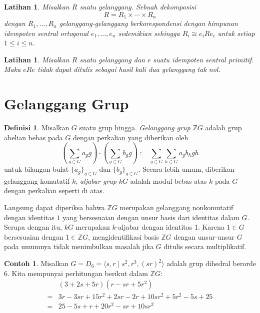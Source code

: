 \documentclass[12pt]{article}
\theoremstyle{plain}
\newtheorem{exercise}[theorem]{Latihan}
\theoremstyle{definition}
\newtheorem{definition}[theorem]{Definisi}
\newtheorem{example}[theorem]{Contoh}
\theoremstyle{remark}
\numberwithin{equation}{section}
\begin{document}
\begin{exercise}
Misalkan $R$ suatu gelanggang. Sebuah dekomposisi
\[
R= R_1 \times \cdots \times R_n
\]
dengan $R_1,\ldots,R_n$ gelanggang-gelanggang berkorespondensi dengan himpunan
idempoten sentral ortogonal $e_1,\ldots,e_n$ sedemikian
sehingga $R_i \cong e_iRe_i$ untuk setiap $1 \le i \le n$.
\end{exercise}

\begin{exercise}
Misalkan $R$ suatu gelanggang dan $e$ suatu idempoten sentral primitif.
Maka $eRe$ tidak dapat ditulis sebagai hasil kali dua gelanggang tak nol.
\end{exercise}



\section{Gelanggang Grup}

\begin{definition}
Misalkan $G$ suatu grup hingga.
\emph{Gelanggang grup} $\mathbb{Z}G$ adalah grup abelian bebas
pada $G$ dengan perkalian yang diberikan oleh
\[
\left( \sum_{g \in G} a_g g \right) \cdot
\left( \sum_{g \in G} b_g g \right)
:= \sum_{g \in G} \sum_{h \in G} a_gb_h gh
\]
untuk bilangan bulat $\{a_g\}_{g\in G}$ dan $\{b_g\}_{g\in G}$.
Secara lebih umum, diberikan gelanggang komutatif $k$,
\emph{aljabar grup} $kG$ adalah modul bebas atas $k$ pada $G$
dengan perkalian seperti di atas.
\end{definition}

Langsung dapat diperiksa bahwa $\mathbb{Z}G$ merupakan gelanggang nonkomutatif dengan
identitas $1$ yang bersesuaian dengan unsur basis dari identitas dalam $G$.
Serupa dengan itu, $kG$ merupakan $k$-aljabar dengan identitas $1$.
Karena $1 \in G$ bersesuaian dengan $1 \in \mathbb{Z}G$,
mengidentifikasi basis $\mathbb{Z}G$ dengan unsur-unsur
$G$ pada umumnya tidak menimbulkan masalah jika $G$ ditulis secara multiplikatif.

\begin{example}
Misalkan $G=D_6=\langle s,r \mid s^2, r^3, (sr)^2 \rangle$
adalah grup dihedral berorde $6$.
Kita mempunyai perhitungan berikut dalam $\mathbb{Z}G$:
\begin{align*}
&(3 + 2s + 5r)(r-sr + 5r^2)\\
=& 3r -3sr +15r^2 + 2sr -2r+10sr^2 +5r^2 -5s+25\\
=& 25 -5s + r + 20r^2 -sr +10sr^2
\end{align*}
\end{example}
\end{document}
